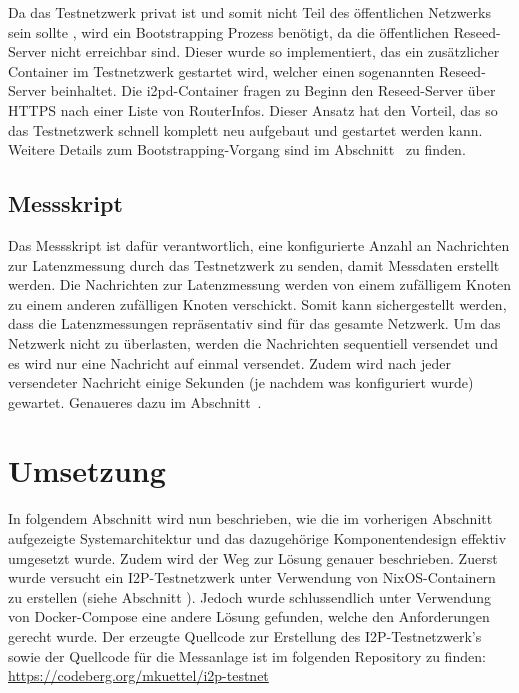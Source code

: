 Da das Testnetzwerk privat ist und somit nicht Teil des öffentlichen Netzwerks sein sollte , wird ein Bootstrapping Prozess benötigt, da die öffentlichen Reseed-Server nicht erreichbar sind.
Dieser wurde so implementiert, das ein zusätzlicher Container im Testnetzwerk gestartet wird, welcher einen sogenannten Reseed-Server beinhaltet.
Die i2pd-Container fragen zu Beginn den Reseed-Server über HTTPS nach einer Liste von RouterInfos.
Dieser Ansatz hat den Vorteil, das so das Testnetzwerk schnell komplett neu aufgebaut und gestartet werden kann.
Weitere Details zum Bootstrapping-Vorgang sind im Abschnitt~ zu finden.

\subsection{Messskript}

Das Messskript ist dafür verantwortlich, eine konfigurierte Anzahl an Nachrichten zur Latenzmessung durch das Testnetzwerk zu senden, damit Messdaten erstellt werden.
Die Nachrichten zur Latenzmessung werden von einem zufälligem Knoten zu einem anderen zufälligen Knoten verschickt.
Somit kann sichergestellt werden, dass die Latenzmessungen repräsentativ sind für das gesamte Netzwerk.
Um das Netzwerk nicht zu überlasten, werden die Nachrichten sequentiell versendet und es wird nur eine Nachricht auf einmal versendet.
Zudem wird nach jeder versendeter Nachricht einige Sekunden (je nachdem was konfiguriert wurde) gewartet. Genaueres dazu im Abschnitt~.

\section{Umsetzung}\label{sec:umsetzung}

In folgendem Abschnitt wird nun beschrieben,
wie die im vorherigen Abschnitt aufgezeigte Systemarchitektur und das dazugehörige Komponentendesign effektiv umgesetzt wurde.
Zudem wird der Weg zur Lösung genauer beschrieben.
Zuerst wurde versucht ein I2P-Testnetzwerk unter Verwendung von NixOS-Containern zu erstellen (siehe Abschnitt ).
Jedoch wurde schlussendlich unter Verwendung von Docker-Compose eine andere Lösung gefunden, welche den Anforderungen gerecht wurde.
Der erzeugte Quellcode zur Erstellung des I2P-Testnetzwerk's sowie der Quellcode für die Messanlage ist im folgenden Repository zu finden:\\
\url{https://codeberg.org/mkuettel/i2p-testnet}

